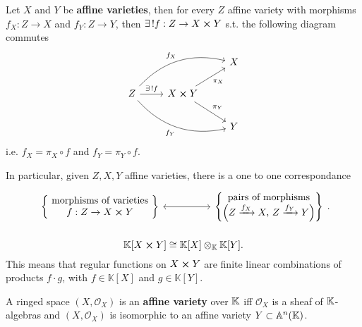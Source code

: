 \begin{prop}
	Let $X$ and $Y$ be \textbf{affine varieties}, then for every $Z$ affine variety with morphisms $f_X: Z \to X$ and $f_Y: Z \to Y$, then $\exists\, ! f: Z \to X \cross Y$ s.t. the following diagram commutes
	\begin{equation}
	\begin{tikzcd}
		& & X\\
		Z \arrow[r, "\exists\, ! f", rightarrow] \arrow[rru, "f_X", rightarrow, bend left] \arrow[drr, "f_Y"', rightarrow, bend right] & X \cross Y \arrow[ru, "\pi_X"', rightarrow] \arrow[rd, "\pi_Y", rightarrow] & \\
		& & Y
	\end{tikzcd}	
	\end{equation}
	i.e. $f_X = \pi_X \circ f$ and $f_Y = \pi_Y \circ f$.

	In particular, given $Z,X,Y$ affine varieties, there is a one to one correspondance
	\begin{equation}
		\begin{tikzcd}[row sep=tiny]
			\left\{\begin{matrix}
				\text{ morphisms of varieties }\\
				f: Z \to X \cross Y
			\end{matrix}\right\} \arrow[rr, "", leftrightarrow] & &
			\left\{  \begin{matrix}
				\ \text{pairs of morphisms }\\
				\left(Z \xrightarrow{f_X} X,\, Z \xrightarrow{f_Y} Y\right)
			\end{matrix}\right\} \\
	\end{tikzcd}
	.\end{equation} 
\end{prop} 

\begin{rem}
	\begin{equation}
	\mathbb{K}[X \cross Y] \cong \mathbb{K}[X] \otimes_{\mathbb{K}} \mathbb{K}[Y]
	.\end{equation} 
	This means that regular functions on $X \cross Y$ are finite linear combinations of products $f \cdot g$, with $f \in \mathbb{K}[X]$ and $g \in \mathbb{K}[Y]$. 
\end{rem}

\begin{defn}
	A ringed space $\left( X, \mathcal{O}_{ X } \right)$ is an \textbf{affine variety} over $\mathbb{K}$ iff $\mathcal{O}_X$ is a sheaf of $\mathbb{K}$-algebras and $\left( X, \mathcal{O}_{ X } \right)$ is isomorphic to an affine variety $Y \subset \mathbb{A}^n(\mathbb{K})$.
\end{defn}

